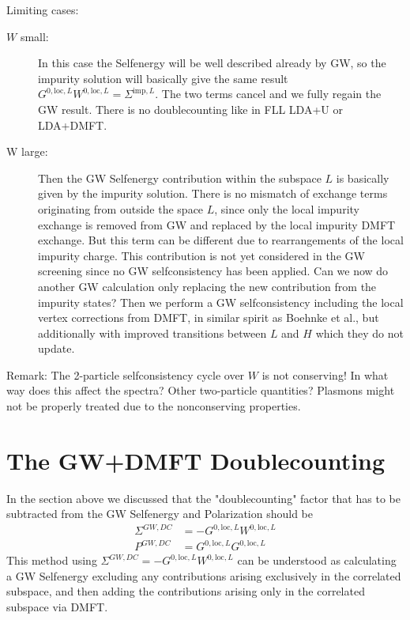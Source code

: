 \documentclass[12pt,a4paper]{scrartcl}
\numberwithin{equation}{section}
\newcommand{\cng}[1]{{\color{red}#1}}
\begin{document}
Limiting cases:
\begin{description}
\item[$W$ small:] In this case the Selfenergy will be well described already by GW, so the impurity solution
will basically give the same result $G^{0,\mathrm{loc},L}W^{0,\mathrm{loc},L} = \Sigma^{\mathrm{imp},L}$.
The two terms cancel and we fully regain the GW result. There is no doublecounting like in FLL LDA+U or LDA+DMFT.
\item[W large:] Then the GW Selfenergy contribution within the subspace $L$ is basically given by the impurity solution.
There is no mismatch of exchange terms originating from outside the space $L$, since only the local impurity exchange
is removed from GW and replaced by the local impurity DMFT exchange. But this term can be different due to rearrangements
of the local impurity charge. This contribution is not yet considered in the GW screening since no GW selfconsistency
has been applied.
\cng{Can we now do another GW calculation only replacing the new contribution from the impurity states?
Then we perform a GW selfconsistency including the  local vertex corrections from DMFT, in similar spirit as Boehnke et al., but additionally with improved transitions between
$L$ and $H$ which they do not update.}
\end{description}
Remark: The 2-particle selfconsistency cycle over $W$ is not conserving! In what way
does this affect the spectra? Other two-particle quantities?
Plasmons might not be properly treated due to the nonconserving
properties.

\section{The GW+DMFT Doublecounting}
In the section above we discussed that the "doublecounting" factor
that has to be subtracted from the GW Selfenergy and Polarization
should be 
\begin{align}
\Sigma^{GW,DC} &= -G^{0,\mathrm{loc},L}W^{0,\mathrm{loc},L} \\
P^{GW,DC} &= G^{0,\mathrm{loc},L}G^{0,\mathrm{loc},L}
\end{align}
This method using $\Sigma^{GW,DC} = -G^{0,\mathrm{loc},L}W^{0,\mathrm{loc},L}$
can be understood as calculating a GW Selfenergy excluding any contributions arising
exclusively in the correlated subspace, and then adding the contributions arising only in
the correlated subspace via DMFT. 
\end{document}
